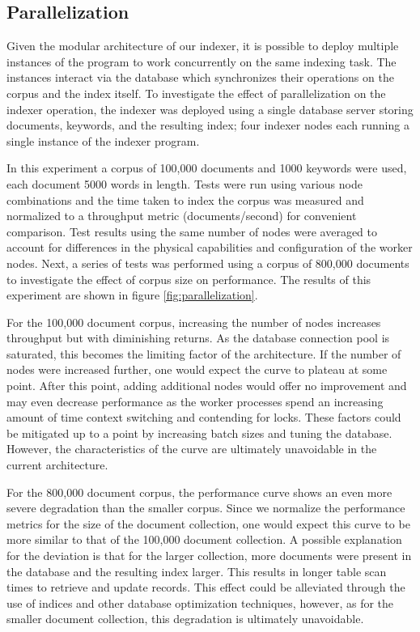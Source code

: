 \documentclass[10pt]{article}
\begin{document}
\subsection{Parallelization}
\label{parallelization}
Given the modular architecture of our indexer, it is possible to
deploy multiple instances of the program to work concurrently on the same
indexing task. The instances interact via the database which
synchronizes their operations on the corpus and the index itself. To
investigate the effect of parallelization on the indexer operation, the
indexer was deployed using a single database server storing documents,
keywords, and the resulting index; four indexer nodes each running a
single instance of the indexer program. 

In this experiment a corpus of 100,000 documents and 1000 keywords were
used, each document 5000 words in length. Tests were run using various
node combinations and the time taken to index the corpus was measured and
normalized to a throughput metric (documents/second) for convenient
comparison. Test results using the same number of nodes were averaged
to account for differences in the physical capabilities and
configuration of the worker nodes. Next, a series of tests was
performed using a corpus of 800,000 documents to investigate the
effect of corpus size on performance. The results of this experiment
are shown in figure \ref{fig:parallelization}.

For the 100,000 document corpus, increasing the number of nodes
increases throughput but with diminishing returns. As the database
connection pool is saturated, this becomes the limiting factor of the
architecture. If the number of nodes were increased further, one would
expect the curve to plateau at some point. After this point, adding
additional nodes would offer no improvement and may even decrease
performance as the worker processes spend an increasing amount of time
context switching and contending for locks. These factors could be
mitigated up to a point by increasing batch sizes and tuning the
database. However, the characteristics of the curve are ultimately
unavoidable in the current architecture. 

For the 800,000 document corpus, the performance curve shows an even
more severe degradation than the smaller corpus. Since we normalize
the performance metrics for the size of the document collection, one
would expect this curve to be more similar to that of the 100,000
document collection. A possible explanation for the deviation is that
for the larger collection, more documents were present in the
database and the resulting index larger. This results in longer table
scan times to retrieve and update records. This effect could be
alleviated through the use of indices and other database optimization
techniques, however, as for the smaller document
collection, this degradation is ultimately unavoidable.
\end{document}
